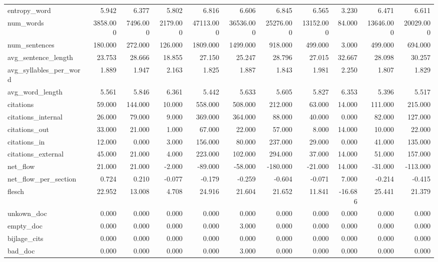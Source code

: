 \begin{tabular}{lrrrrrrrrrr}
\cline{1-11}
entropy\_word & 5.942 & 6.377 & 5.802 & 6.816 & 6.606 & 6.845 & 6.565 & 3.230 & 6.471 & 6.611 \\
\cline{1-11}
num\_words & 3858.000 & 7496.000 & 2179.000 & 47113.000 & 36536.000 & 25276.000 & 13152.000 & 84.000 & 13646.000 & 20029.000 \\
\cline{1-11}
num\_sentences & 180.000 & 272.000 & 126.000 & 1809.000 & 1499.000 & 918.000 & 499.000 & 3.000 & 499.000 & 694.000 \\
\cline{1-11}
avg\_sentence\_length & 23.753 & 28.666 & 18.855 & 27.150 & 25.247 & 28.796 & 27.015 & 32.667 & 28.098 & 30.257 \\
\cline{1-11}
avg\_syllables\_per\_word & 1.889 & 1.947 & 2.163 & 1.825 & 1.887 & 1.843 & 1.981 & 2.250 & 1.807 & 1.829 \\
\cline{1-11}
avg\_word\_length & 5.561 & 5.846 & 6.361 & 5.442 & 5.633 & 5.605 & 5.827 & 6.353 & 5.396 & 5.517 \\
\cline{1-11}
citations & 59.000 & 144.000 & 10.000 & 558.000 & 508.000 & 212.000 & 63.000 & 14.000 & 111.000 & 215.000 \\
\cline{1-11}
citations\_internal & 26.000 & 79.000 & 9.000 & 369.000 & 364.000 & 88.000 & 40.000 & 0.000 & 82.000 & 127.000 \\
\cline{1-11}
citations\_out & 33.000 & 21.000 & 1.000 & 67.000 & 22.000 & 57.000 & 8.000 & 14.000 & 10.000 & 22.000 \\
\cline{1-11}
citations\_in & 12.000 & 0.000 & 3.000 & 156.000 & 80.000 & 237.000 & 29.000 & 0.000 & 41.000 & 135.000 \\
\cline{1-11}
citations\_external & 45.000 & 21.000 & 4.000 & 223.000 & 102.000 & 294.000 & 37.000 & 14.000 & 51.000 & 157.000 \\
\cline{1-11}
net\_flow & 21.000 & 21.000 & -2.000 & -89.000 & -58.000 & -180.000 & -21.000 & 14.000 & -31.000 & -113.000 \\
\cline{1-11}
net\_flow\_per\_section & 0.724 & 0.210 & -0.077 & -0.179 & -0.259 & -0.604 & -0.071 & 7.000 & -0.214 & -0.415 \\
\cline{1-11}
flesch & 22.952 & 13.008 & 4.708 & 24.916 & 21.604 & 21.652 & 11.841 & -16.686 & 25.441 & 21.379 \\
\cline{1-11}
unkown\_doc & 0.000 & 0.000 & 0.000 & 0.000 & 0.000 & 0.000 & 0.000 & 0.000 & 0.000 & 0.000 \\
\cline{1-11}
empty\_doc & 0.000 & 0.000 & 0.000 & 0.000 & 3.000 & 0.000 & 0.000 & 0.000 & 0.000 & 0.000 \\
\cline{1-11}
bijlage\_cits & 0.000 & 0.000 & 0.000 & 0.000 & 0.000 & 0.000 & 0.000 & 0.000 & 0.000 & 0.000 \\
\cline{1-11}
bad\_doc & 0.000 & 0.000 & 0.000 & 0.000 & 3.000 & 0.000 & 0.000 & 0.000 & 0.000 & 0.000 \\
\cline{1-11}
\bottomrule
\end{tabular}
